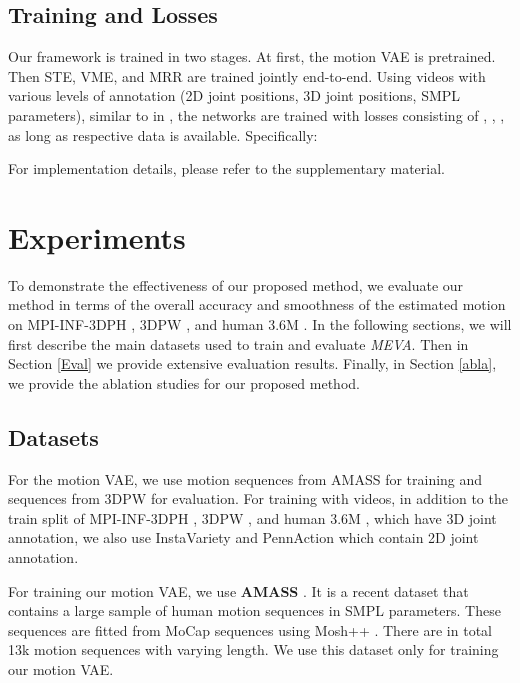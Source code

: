\documentclass[runningheads]{llncs}
\begin{document}
\subsection{Training and Losses}
Our framework is trained in two stages.
At first, the motion VAE is pretrained. Then STE, VME, and MRR are trained jointly end-to-end. Using videos with various levels of annotation (2D joint positions, 3D joint positions, SMPL parameters), similar to in \cite{hmmr,vibe,spin}, the networks are trained with losses consisting of , , , as long as respective data is available. Specifically: 


For implementation details, please refer to the supplementary material. 




\section{Experiments}
To demonstrate the effectiveness of our proposed method, we evaluate our method in terms of  the  overall  accuracy  and  smoothness  of  the  estimated motion  on MPI-INF-3DPH \cite{mpi3d}, 3DPW \cite{3dpw}, and human 3.6M \cite{h36m}.
In the following sections, we will first describe the main datasets used to train and evaluate \textit{MEVA}. Then in Section \ref{Eval} we provide extensive evaluation results. Finally, in Section \ref{abla}, we provide the ablation studies for our proposed method.

\subsection{Datasets}

For the motion VAE, we use motion sequences from AMASS \cite{amass} for training and sequences from 3DPW \cite{3dpw} for evaluation. For training with videos, in addition to the train split of MPI-INF-3DPH \cite{mpi3d}, 3DPW \cite{3dpw}, and human 3.6M \cite{h36m}, which have 3D joint annotation, we also use InstaVariety \cite{hmmr} and PennAction \cite{pennaction} which contain 2D joint annotation.




For training our motion VAE, we use \textbf{AMASS} \cite{amass}. It is a recent dataset that contains a large sample of human motion sequences in SMPL parameters. These sequences are fitted from MoCap sequences using Mosh++ \cite{amass}. There are in total 13k motion sequences with varying length. We use this dataset only for training our motion VAE. 
\end{document}
